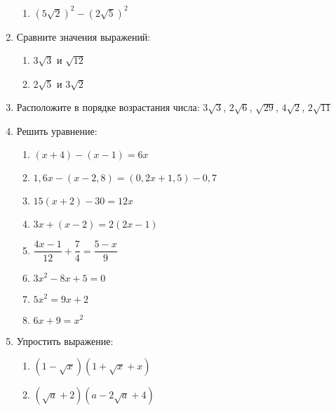 \documentclass[12pt, a4paper]{article}
\begin{document}
\begin{enumerate}
\begin{multicols}{2}
\begin{enumerate}[label=\asbuk*)]
			\item $(5\sqrt{2})^2-(2\sqrt{5})^2$
		\end{enumerate}
	\end{multicols}
	\item Сравните значения выражений:
	\begin{multicols}{2}
		\begin{enumerate}[label=\asbuk*)]
			\item $3\sqrt{3}$ и $\sqrt{12}$
			\item $2\sqrt{5}$ и $3\sqrt{2}$
		\end{enumerate}
	\end{multicols}
	\item Расположите в порядке возрастания числа:
	$3\sqrt{3}$, $2\sqrt{6}$, $\sqrt{29}$, $4\sqrt{2}$, $2\sqrt{11}$
	\item Решить уравнение:
	\begin{multicols}{2}
		\begin{enumerate}[label=\asbuk*)]
			\item $(x+4)-(x-1)=6x$
			\item $1,6x-(x-2,8)=(0,2x+1,5)-0,7$
			\item $15(x+2)-30=12x$
			\item $3x+(x-2)=2(2x-1)$
			\item $\dfrac{4x-1}{12}+\dfrac{7}{4}=\dfrac{5-x}{9}$
			\item $3x^2-8x+5=0$
			\item $5x^2=9x+2$
			\item $6x+9=x^2$
		\end{enumerate}
	\end{multicols}
	\item Упростить выражение:
	\begin{multicols}{2}
		\begin{enumerate}[label=\asbuk*)]
			\item $(1-\sqrt{x})(1+\sqrt{x}+x)$
			\item $(\sqrt{a}+2)(a-2\sqrt{a}+4)$
		\end{enumerate}
	\end{multicols}
\end{enumerate}
\end{document}
